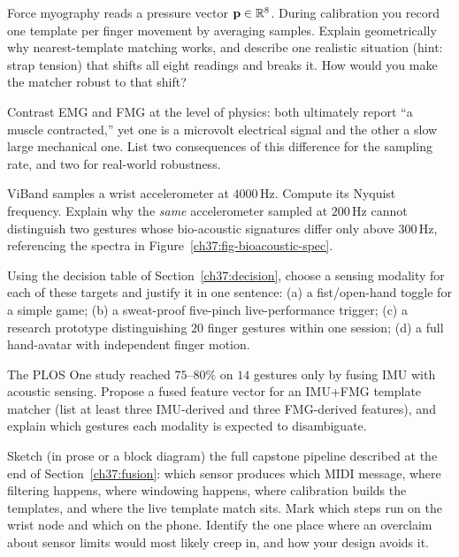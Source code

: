 \begin{exercise}
Force myography reads a pressure vector $\mathbf{p}\in\mathbb{R}^{8}$. During calibration you
record one template per finger movement by averaging samples. Explain geometrically
why nearest-template matching works, and describe one realistic situation (hint: strap
tension) that shifts all eight readings and breaks it. How would you make the matcher
robust to that shift?
\end{exercise}

\begin{exercise}
Contrast EMG and FMG at the level of physics: both ultimately report ``a muscle
contracted,'' yet one is a microvolt electrical signal and the other a slow large
mechanical one. List two consequences of this difference for the sampling rate, and
two for real-world robustness.
\end{exercise}

\begin{exercise}
ViBand samples a wrist accelerometer at $4000$\,Hz. Compute its Nyquist frequency.
Explain why the \emph{same} accelerometer sampled at $200$\,Hz cannot distinguish two
gestures whose bio-acoustic signatures differ only above $300$\,Hz, referencing the
spectra in Figure~\ref{ch37:fig-bioacoustic-spec}.
\end{exercise}

\begin{exercise}
Using the decision table of Section~\ref{ch37:decision}, choose a sensing modality for
each of these targets and justify it in one sentence: (a) a fist/open-hand toggle for
a simple game; (b) a sweat-proof five-pinch live-performance trigger; (c) a research
prototype distinguishing $20$ finger gestures within one session; (d) a full
hand-avatar with independent finger motion.
\end{exercise}

\begin{exercise}
The PLOS One study reached $75$--$80\%$ on $14$ gestures only by fusing IMU with
acoustic sensing. Propose a fused feature vector for an IMU+FMG template matcher (list
at least three IMU-derived and three FMG-derived features), and explain which gestures
each modality is expected to disambiguate.
\end{exercise}

\begin{exercise}
Sketch (in prose or a block diagram) the full capstone pipeline described at the end of
Section~\ref{ch37:fusion}: which sensor produces which MIDI message, where filtering
happens, where windowing happens, where calibration builds the templates, and where
the live template match sits. Mark which steps run on the wrist node and which on the
phone. Identify the one place where an overclaim about sensor limits would most likely
creep in, and how your design avoids it.
\end{exercise}
